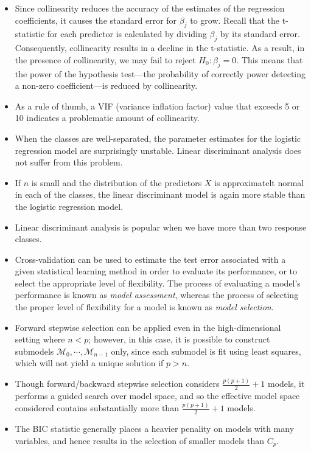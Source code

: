 \documentclass{article}
\begin{document}
\begin{itemize}
    \item Since collinearity reduces the accuracy of the estimates of the regression coefficients, it causes the standard error for $\beta_j$ to grow. Recall that the t-statistic for each predictor is calculated by dividing $\beta_j$ by its standard 
    error. Consequently, collinearity results in a decline in the t-statistic. As a result, in the presence of collinearity, we may fail to reject $H_0:\beta_j=0$. This means that the power of the hypothesis test—the probability of correctly power detecting a non-zero coefficient—is reduced by collinearity.
    \item As a rule of thumb, a VIF (variance inflation factor) value that exceeds 5 or 10 indicates a problematic amount of collinearity.
    \item When the classes are well-separated, the parameter estimates for the logistic regression model are surprisingly unstable. Linear discriminant analysis does not suffer from this problem.
    \item If $n$ is small and the distribution of the predictors $X$ is approximatelt normal in each of the classes, the linear discriminant model is again more stable than the logistic regression model.
    \item Linear discriminant analysis is popular when we have more than two response classes.
    \item Cross-validation can be used to estimate the test error associated with a given statistical learning method in order to evaluate its performance, or to select the appropriate level of flexibility. The process of evaluating a model's performance is known as \textit{model assessment}, whereas the process of selecting the proper level of flexibility for a model is known as \textit{model selection}.
    \item Forward stepwise selection can be applied even in the high-dimensional setting where $n<p$; however, in this case, it is possible to construct submodels $\mathcal{M}_0,\cdots,\mathcal{M}_{n-1}$ only, since each submodel is fit using least squares, which will not yield a unique solution if $p>n$.
    \item Though forward/backward stepwise selection considers $\frac{p(p+1)}{2}+1$ models, it performs a guided search over model space, and so the effective model space considered contains substantially more than $\frac{p(p+1)}{2}+1$ models.
    \item The BIC statistic generally places a heavier penality on models with many variables, and hence results in the selection of smaller models than $C_p$.

\end{itemize}
\end{document}
